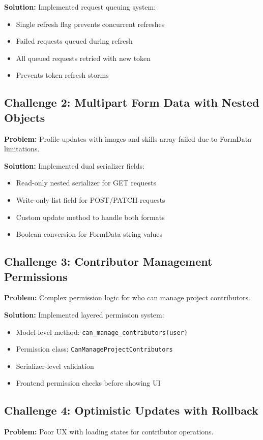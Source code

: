\documentclass[11pt,a4paper]{article}
\begin{document}
\textbf{Solution:} Implemented request queuing system:
\begin{itemize}[leftmargin=*]
    \item Single refresh flag prevents concurrent refreshes
    \item Failed requests queued during refresh
    \item All queued requests retried with new token
    \item Prevents token refresh storms
\end{itemize}

\subsection{Challenge 2: Multipart Form Data with Nested Objects}
\textbf{Problem:} Profile updates with images and skills array failed due to FormData limitations.

\textbf{Solution:} Implemented dual serializer fields:
\begin{itemize}[leftmargin=*]
    \item Read-only nested serializer for GET requests
    \item Write-only list field for POST/PATCH requests
    \item Custom update method to handle both formats
    \item Boolean conversion for FormData string values
\end{itemize}

\subsection{Challenge 3: Contributor Management Permissions}
\textbf{Problem:} Complex permission logic for who can manage project contributors.

\textbf{Solution:} Implemented layered permission system:
\begin{itemize}[leftmargin=*]
    \item Model-level method: \texttt{can\_manage\_contributors(user)}
    \item Permission class: \texttt{CanManageProjectContributors}
    \item Serializer-level validation
    \item Frontend permission checks before showing UI
\end{itemize}

\subsection{Challenge 4: Optimistic Updates with Rollback}
\textbf{Problem:} Poor UX with loading states for contributor operations.
\end{document}
